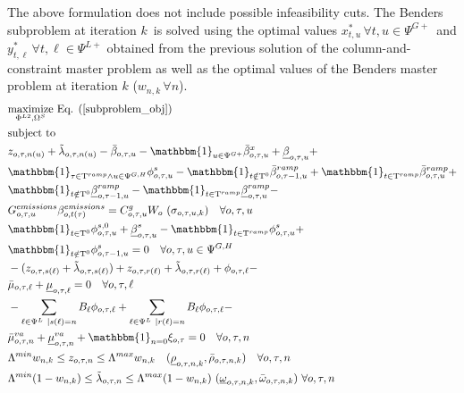 \documentclass[final]{IEEEtran}
\newcommand{\Tau}{\mathrm{T}}
\begin{document}
The above formulation does not include possible infeasibility cuts. The Benders subproblem at iteration $k$ is solved using the optimal values $x_{t, u}^* \, \forall t, u \in \Psi^{G+}$ and $y_{t, \ell}^* \, \forall t, \ell \in \Psi^{L+}$ obtained from the previous solution of the column-and-constraint master problem as well as the optimal values of the Benders master problem at iteration $k$ ($w_{n, k} \, \forall n$).
\begin{align}
&\label{benders_slave_obj}\underset{\Phi^{L2}, \Omega^{S}}{\text{maximize}} \textrm{ Eq. (\ref{subproblem_obj})} \\
&\text{subject to} \nonumber \\
&z_{o, \tau, n(u)} + \tilde{\lambda}_{o, \tau, n(u)} - \bar{\beta}_{o, \tau, u} - \mathbbm{1}_{u \in \Psi^{G+}} \bar{\beta}^x_{o, \tau, u} + \underline{\beta}_{o, \tau, u} + \nonumber \\
&\mathbbm{1}_{\tau \in \Tau^{ramp} \land u \in \Psi^{G, H}} \phi_{o, \tau, u}^{s} - \mathbbm{1}_{t \notin \Tau^0} \bar{\beta}_{o, \tau - 1, u}^{ramp} + \mathbbm{1}_{t \in \Tau^{ramp}} \bar{\beta}_{o, \tau, u}^{ramp} + \nonumber \\
&\mathbbm{1}_{t \notin \Tau^0} \underline{\beta}_{o, \tau - 1, u}^{ramp} - \mathbbm{1}_{t \in \Tau^{ramp}} \underline{\beta}_{o, \tau, u}^{ramp} - \nonumber \\
&G_{o, \tau, u}^{emissions} \beta_{o, t(\tau)}^{emissions} = C^g_{o, \tau, u}  W_o \, \, (\sigma_{o, \tau, u, k}) \quad \forall o, \tau, u \\
&\mathbbm{1}_{t \in \Tau^0} \phi_{o, \tau, u}^{s,0} + \underline{\beta}_{o, \tau, u}^s - \mathbbm{1}_{t \in \Tau^{ramp}} \phi_{o, \tau, u}^{s} + \nonumber \\
&\mathbbm{1}_{t \notin \Tau^0} \phi_{o, \tau - 1, u}^{s} = 0 \quad \forall o, \tau, u \in \Psi^{G, H} \\
&-(z_{o, \tau, s(\ell)} + \tilde{\lambda}_{o, \tau, s(\ell)}) + z_{o, \tau, r(\ell)} + \tilde{\lambda}_{o, \tau, r(\ell)} + \phi_{o, \tau, \ell} - \nonumber \\
&\bar{\mu}_{o, \tau, \ell} + \underline{\mu}_{o, \tau, \ell} = 0 \quad \forall o, \tau, \ell \\
&-\sum\limits_{\ell \in \Psi^L | s(\ell) = n} B_\ell \phi_{o, \tau, \ell} + \sum\limits_{\ell \in \Psi^L | r(\ell) = n} B_\ell \phi_{o, \tau, \ell} - \nonumber \\
&\bar{\mu}^{va}_{o, \tau, n} + \underline{\mu}^{va}_{o, \tau, n} + \mathbbm{1}_{n = 0} \xi_{o, \tau} = 0 \quad \forall o, \tau, n \\
&\Lambda^{min} w_{n, k} \leq z_{o, \tau, n} \leq \Lambda^{max} w_{n, k} \quad (\underline{\rho}_{o, \tau, n, k}, \bar{\rho}_{o, \tau, n, k}) \quad \forall o,\tau,n \\
&\label{benders_slave_last}\Lambda^{min} (1 - w_{n, k}) \leq \tilde{\lambda}_{o, \tau, n} \leq \Lambda^{max} (1 - w_{n, k}) \, \, (\underline{\omega}_{o, \tau, n, k}, \bar{\omega}_{o, \tau, n, k}) \, \, \forall o,\tau,n
\end{align}
\end{document}

